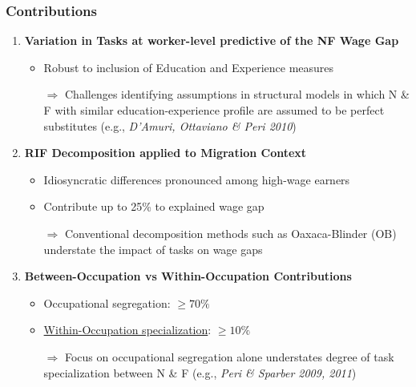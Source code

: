 \documentclass[10pt]{beamer}
\begin{document}
\begin{frame}
	\frametitle{Contributions}
	
	\begin{enumerate}
		\item \textbf{Variation in Tasks at worker-level predictive of the NF Wage Gap}
		\begin{itemize}
			\item Robust to inclusion of Education and Experience measures
			\medskip
			\item[$\Rightarrow$] Challenges identifying assumptions in structural models in which N \& F with similar education-experience profile are assumed to be perfect substitutes (e.g., \textit{D'Amuri, Ottaviano \& Peri 2010})
		\end{itemize} 
		
		\smallskip
		
		\item \textbf{RIF Decomposition applied to Migration Context}
		\begin{itemize}
			\item Idiosyncratic differences pronounced among high-wage earners 
			\item Contribute up to 25\% to explained wage gap
			\medskip
			\item[$\Rightarrow$] Conventional decomposition methods such as Oaxaca-Blinder (OB) understate the impact of tasks on wage gaps
		\end{itemize} 
		
		\smallskip
		
		\item \textbf{Between-Occupation vs Within-Occupation Contributions}
		\begin{itemize}
			\item Occupational segregation: $\geq 70\%$ 
			\item \underline{Within-Occupation specialization}: $\geq 10\%$   %
			\medskip
			\item[$\Rightarrow$] Focus on occupational segregation alone understates degree of task specialization between N \& F (e.g., \textit{Peri \& Sparber 2009, 2011})
		\end{itemize} 
		
		
		
	\end{enumerate}
	
	
	
\end{frame}
\end{document}
